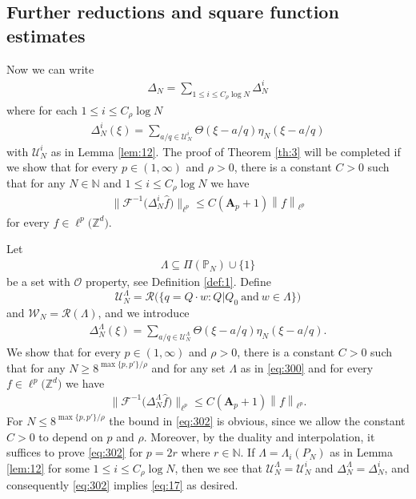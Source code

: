 \documentclass[a4paper,oneside]{amsart}
\theoremstyle{plain}
\theoremstyle{definition}
\numberwithin{equation}{section}
\theoremstyle{plain}
\newcommand{\ZZ}{\mathbb{Z}}
\newcommand{\NN}{\mathbb{N}}
\newcommand{\boldA}{\mathbf{A}}
\newcommand{\calF}{\mathcal{F}}
\newcommand{\vnorm}[1]{{\left\lVert {#1} \right\rVert}}
\newcommand{\8}{\infty}
\begin{document}
\subsection{Further reductions and square function estimates}
Now we can write 
\begin{align*}
\Delta_N=\sum_{1\le i\le C_{\rho}\log N}\Delta_N^i
\end{align*}
where for each $1\le i\le C_{\rho}\log N$ 
\begin{align}
  \label{eq:290}
	\Delta_N^i(\xi)
	=\sum_{a/q \in\mathscr{U}_N^i}
	 \Theta(\xi - a/q) \eta_N(\xi - a/q)  
\end{align}
with $\mathscr{U}_N^i$  as in Lemma \ref{lem:12}.
The proof of Theorem \ref{th:3} will be completed if we
show that for every $p\in(1, \infty)$ and $\rho>0$, there is a
constant $C>0$ such that for any $N\in\NN$ and
$1\le i\le C_{\rho} \log N$ we have
 \begin{align}
\label{eq:17}
        \big\lVert
        \calF^{-1}\big(\Delta_N^{i} \hat{f}\big)\big\rVert_{\ell^{p}} 
		\leq C (\boldA_p+1) \vnorm{f}_{\ell^{p}}
        \end{align}
        for every $f\in\ell^p\big(\ZZ^d\big)$.  

Let 
        \begin{align}
          \label{eq:300}
\Lambda \subseteq \Pi(\mathbb P_N)\cup\{1\}          
        \end{align}
        be a set with $\mathcal O$ property, see Definition
        \ref{def:1}. Define
\[
\mathscr{U}_N^\Lambda=\mathcal R\big(\big\{q=Q\cdot w: Q|Q_0\ \text{and}\ w\in
\Lambda\big\}\big)
\]
and $\mathscr{W}_N =\mathcal R(\Lambda)$, and we introduce
\begin{align}
  \label{eq:301}
  \Delta_N^\Lambda(\xi)
	=\sum_{a/q \in\mathscr{U}_N^\Lambda}
	 \Theta(\xi - a/q) \eta_N(\xi - a/q).  
\end{align}
We show that for every $p\in(1, \infty)$ and $\rho>0$, there is a
constant $C>0$ such that for any  $N\ge 8^{\max\{p, p'\}/\rho}$ and for
any set $\Lambda$ as in \eqref{eq:300} and
        for every $f\in\ell^p\big(\ZZ^d\big)$ we have
 \begin{align}
\label{eq:302}
        \big\lVert
        \calF^{-1}\big(\Delta_N^{\Lambda} \hat{f}\big)\big\rVert_{\ell^{p}} 
		\leq C (\boldA_p+1) \vnorm{f}_{\ell^{p}}.
        \end{align}
For  $N \le 8^{\max\{p, p'\}/\rho}$ the bound in \eqref{eq:302} is obvious, since we allow the
constant $C>0$ to depend on $p$ and $\rho$. Moreover, by the
duality and interpolation, it suffices to prove \eqref{eq:302}
for $p=2r$ where $r\in\NN$. If $\Lambda=\Lambda_i(P_N)$ as in Lemma
\ref{lem:12} for some $1\le i\le
C_{\rho}\log N$, then we see that
$\mathscr{U}_N^\Lambda=\mathscr{U}_N^i$ and
$\Delta_N^{\Lambda}=\Delta_N^i$, and consequently \eqref{eq:302} implies
\eqref{eq:17} as desired. 
\end{document}
